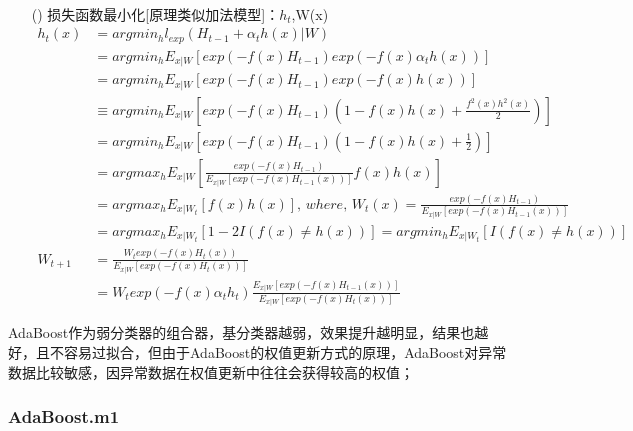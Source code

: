 \documentclass[a4paper]{article}
\begin{document}
\begin{itemize}
\begin{align*}
						\end{align*}
					\item[(\romannumeral4)] 损失函数最小化[原理类似加法模型]：$h_t$,W(x)
						\begin{align*}
							h_t(x) & = argmin_h l_{exp}(H_{t-1}+\alpha_th(x)|W) \\
								   & = argmin_h E_{x|W}[exp(-f(x)H_{t-1})exp(-f(x)\alpha_th(x))]\\
								   & = argmin_h E_{x|W}[exp(-f(x)H_{t-1})exp(-f(x)h(x))]\\
								   & \equiv argmin_h E_{x|W}[exp(-f(x)H_{t-1})(1-f(x)h(x) + \frac{f^2(x)h^2(x)}{2})]\\
								   & = argmin_h E_{x|W}[exp(-f(x)H_{t-1})(1-f(x)h(x) + \frac{1}{2})] \\
								   & = argmax_h E_{x|W}[\frac{exp(-f(x)H_{t-1})}{E_{x|W}[exp(-f(x)H_{t-1}(x))]}f(x)h(x)] \\
								   & = argmax_h E_{x|W_t}[f(x)h(x)], \, where,\, W_t(x) = \frac{exp(-f(x)H_{t-1})}{E_{x|W}[exp(-f(x)H_{t-1}(x))]} \\
								   & = argmax_h E_{x|W_t}[1-2I(f(x)\neq h(x))] = argmin_h E_{x|W_t}[I(f(x)\neq h(x))]\\
						   W_{t+1} & = \frac{W_texp(-f(x)H_t(x))}{E_{x|W}[exp(-f(x)H_t(x))]} \\
						   		   & = W_texp(-f(x)\alpha_th_t)\frac{E_{x|W}[exp(-f(x)H_{t-1}(x))]}{E_{x|W}[exp(-f(x)H_t(x))]}
						\end{align*}
				\end{itemize}
			AdaBoost作为弱分类器的组合器，基分类器越弱，效果提升越明显，结果也越好，且不容易过拟合，但由于AdaBoost的权值更新方式的原理，AdaBoost对异常数据比较敏感，因异常数据在权值更新中往往会获得较高的权值；
		\subsubsection{AdaBoost.m1}
\end{document}
